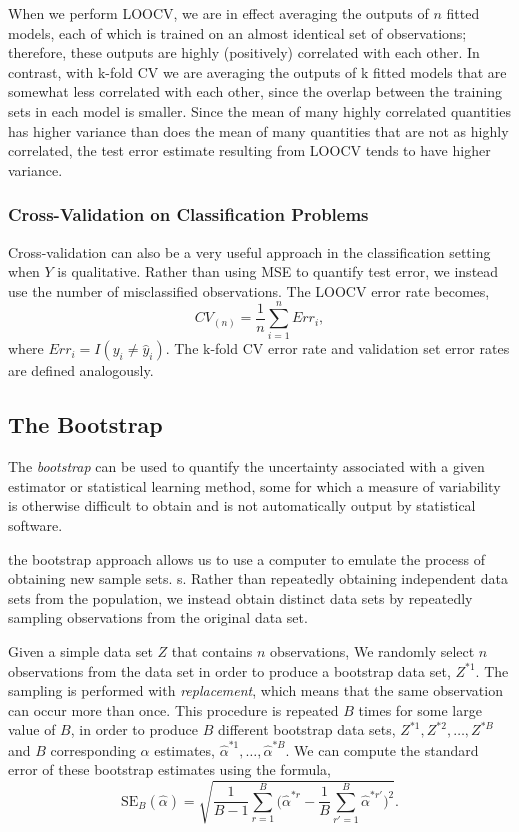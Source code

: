 \documentclass{article}
\numberwithin{equation}{section}
\begin{document}
\begin{enumerate}
When we perform LOOCV, we are in effect averaging the
outputs of $n$ fitted models, each of which is trained on an almost identical set of observations; therefore, these outputs are highly (positively) correlated with each other. In contrast, with k-fold CV we are averaging the outputs of k fitted models that are somewhat less correlated with each other, since the overlap between the training sets in each model is smaller. Since the mean of many highly correlated quantities has higher variance than does the mean of many quantities that are not as highly correlated, the test error estimate resulting from LOOCV tends to have higher variance.

\subsubsection{Cross-Validation on Classification Problems}
Cross-validation can also be a very useful approach in the classification setting when $Y$ is qualitative. Rather than using MSE to quantify test error, we instead use the number of misclassified observations. The LOOCV error rate becomes,
\begin{equation}
    CV_{(n)} = \frac{1}{n}\sum_{i=1}^n Err_i,
\end{equation}
where $Err_i = I(y_i \neq \hat y_i)$. The k-fold CV error rate and validation set error rates are defined analogously.

\subsection{ The Bootstrap}
The \textit{bootstrap} can be used to quantify the uncertainty associated with a given estimator or statistical learning method, some for which a measure of variability is otherwise difficult to obtain and is not automatically output by
statistical software.

the bootstrap approach allows us to use a computer to emulate the process of obtaining new sample sets. s. Rather than repeatedly obtaining independent data sets from the population, we instead obtain distinct data sets by repeatedly sampling observations from the original data set.

Given a simple data set $Z$ that contains $n$ observations, We randomly select $n$ observations from the data set in order to produce a bootstrap data set, $Z^{*1}$.  The sampling is performed with \textit{replacement}, which means that the same observation can occur more than once. This procedure is repeated $B$ times for some large value of $B$, in order to produce
$B$ different bootstrap data sets, $Z^{*1}, Z^{*2},\dots,Z^{*B}$ and $B$ corresponding $\alpha$ estimates, $\hat \alpha^{*1},\dots, \hat \alpha^{*B}$. We can compute the standard error of these bootstrap estimates using the formula,
\begin{equation}
    \text{SE}_B(\hat \alpha) = \sqrt{\frac{1}{B-1} \sum_{r=1}^{B} \Bigg ( \hat \alpha ^{*r} - \frac{1}{B} \sum_{r'=1}^{B} \hat \alpha^{*r'} \Bigg )^2 } .  
\end{equation}



\end{enumerate}
\end{document}

